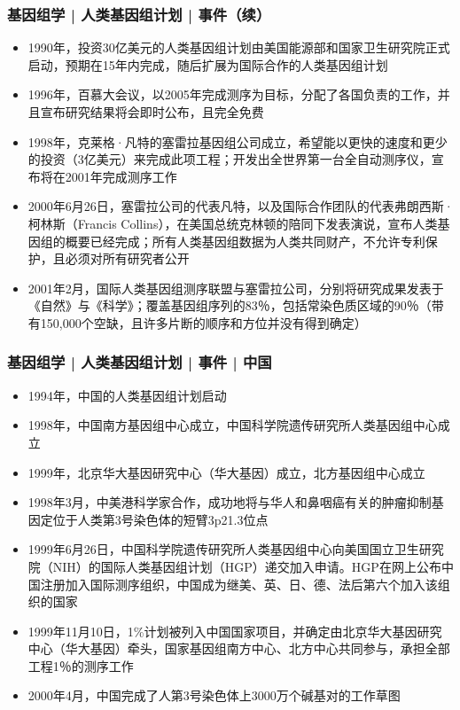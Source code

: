 \begin{frame}
  \frametitle{基因组学 | 人类基因组计划 | 事件（续）}
  \begin{itemize}
    \item 1990年，投资30亿美元的人类基因组计划由美国能源部和国家卫生研究院正式启动，预期在15年内完成，随后扩展为国际合作的人类基因组计划
    \item 1996年，百慕大会议，以2005年完成测序为目标，分配了各国负责的工作，并且宣布研究结果将会即时公布，且完全免费
    \item 1998年，克莱格·凡特的塞雷拉基因组公司成立，希望能以更快的速度和更少的投资（3亿美元）来完成此项工程；开发出全世界第一台全自动测序仪，宣布将在2001年完成测序工作
    \item 2000年6月26日，塞雷拉公司的代表凡特，以及国际合作团队的代表弗朗西斯·柯林斯（Francis Collins），在美国总统克林顿的陪同下发表演说，宣布人类基因组的概要已经完成；所有人类基因组数据为人类共同财产，不允许专利保护，且必须对所有研究者公开
    \item 2001年2月，国际人类基因组测序联盟与塞雷拉公司，分别将研究成果发表于《自然》与《科学》；覆盖基因组序列的83％，包括常染色质区域的90％（带有150,000个空缺，且许多片断的顺序和方位并没有得到确定）
  \end{itemize}
\end{frame}

\begin{frame}
  \frametitle{基因组学 | 人类基因组计划 | 事件 | 中国}
  \begin{itemize}
    \item 1994年，中国的人类基因组计划启动
    \item 1998年，中国南方基因组中心成立，中国科学院遗传研究所人类基因组中心成立
    \item 1999年，北京华大基因研究中心（华大基因）成立，北方基因组中心成立
    \item 1998年3月，中美港科学家合作，成功地将与华人和鼻咽癌有关的肿瘤抑制基因定位于人类第3号染色体的短臂3p21.3位点
    \item 1999年6月26日，中国科学院遗传研究所人类基因组中心向美国国立卫生研究院（NIH）的国际人类基因组计划（HGP）递交加入申请。HGP在网上公布中国注册加入国际测序组织，中国成为继美、英、日、德、法后第六个加入该组织的国家
    \item 1999年11月10日，1\%计划被列入中国国家项目，并确定由北京华大基因研究中心（华大基因）牵头，国家基因组南方中心、北方中心共同参与，承担全部工程1％的测序工作
    \item 2000年4月，中国完成了人第3号染色体上3000万个碱基对的工作草图
  \end{itemize}
\end{frame}

